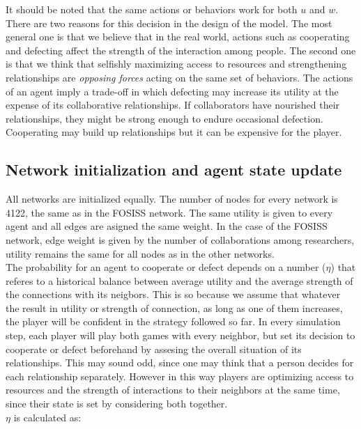 \documentclass{bmcart}
\begin{document}
It should be noted that the same actions or behaviors work for
  both $u$ and $w$. There are two reasons for this decision in the design of the
model. The most general one is that we believe that in the real world,
actions such as cooperating and defecting affect the strength of the interaction
among people. The second one is that we think that selfishly maximizing access to resources and
strengthening relationships are \emph{opposing forces} acting on the same set of
behaviors. The actions of an agent imply a trade-off in which defecting may
increase its utility at the expense of its collaborative relationships. If
collaborators have nourished their relationships, they might be strong enough to
endure occasional defection. Cooperating may build up relationships but it can be
expensive for the player.

\subsection*{Network initialization and agent state update}

All networks are initialized equally. The number of nodes for every network is 4122, the same as in the FOSISS network.
The same utility is given to every agent and all edges are asigned the same weight. In the case of the FOSISS
network, edge weight is given by the number of collaborations among researchers, utility remains the same for all nodes as in
the other networks.\\

The probability for an agent to cooperate or defect depends on a number ($\eta$)
that referes to a historical balance between average utility and the average
strength of the connections with its neigbors. This is so because we assume that
whatever the result in utility or strength of connection, as long as one of them
increases, the player will be confident in the strategy followed so
far. In every simulation step, each player will play both games
  with every neighbor, but set its decision to cooperate or defect beforehand by
  assesing the overall situation of its relationships. This may sound odd, since
  one may think that a person decides for each relationship separately. However
  in this way players are optimizing access to resources and the strength of
  interactions to their neighbors at the same time, since their state is set by
  considering both together.\\  


$\eta$ is calculated as:\\ 
\end{document}
